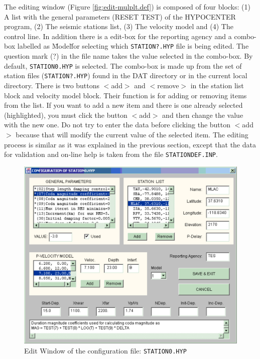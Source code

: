 The editing window (Figure \ref{fig:edit-mulplt.def}) is composed of 
four blocks: (1) A list with the general parameters (RESET TEST) of 
the HYPOCENTER program, (2) The seismic stations list, (3) The velocity 
model and (4) The control line. In addition there is a edit-box for 
the reporting agency and a combo-box labelled as \"Model\" for selecting 
which \texttt{STATION?.HYP} file is being edited. The question mark (?) in the 
file name takes the value selected in the combo-box. By default, 
\texttt{STATION0.HYP} is selected. The combo-box is made up from the set of 
station files (\texttt{STATION?.HYP}) found in the DAT directory or in the 
current local directory. There is two buttons $<$add$>$ and $<$remove$>$ 
in the station list block and velocity model block. Their function 
is for adding or removing items from the list. If you want to add 
a new item and there is one already selected (highlighted), you must 
click the button $<$add$>$ and then change the value with the new one. 
Do not try to enter the data before clicking the button $<$add$>$ 
because that will modify the current value of the selected item. The 
editing process is similar as it was explained in the previous section, 
except that the data for validation and on-line help is taken from 
the file \texttt{STATIONDEF.INP}. 


\begin{figure}
\centerline{\includegraphics[width=0.9\linewidth]{fig/fig4}}
\caption{Edit Window of the configuration file: \texttt{STATION0.HYP}}
\end{figure}

